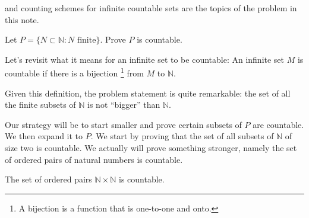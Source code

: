  and counting schemes for infinite countable sets are the topics of the problem in this note. 

\vspace{10 mm}
\begin{problem}
Let $P = \{ N \subset \mathbb{N}: N \text{  finite}\}$. Prove $P$ is countable.	     
\end{problem}

Let's revisit what it means for an infinite set to be countable: An infinite set $M$ is countable if there is a bijection \footnote{A bijection is a function that is one-to-one and onto.} from $M$ to $\mathbb{N}$. 

Given this definition, the problem statement is quite remarkable: the set of all the finite subsets of $\mathbb{N}$ is not ``bigger'' than $\mathbb{N}$.
\newline

\noindent Our strategy will be to start smaller and prove certain subsets of $P$ are countable. We then expand it to $P$. We start by proving that the set of all subsets of $\mathbb{N}$ of size two is countable. We actually will prove something stronger, namely the set of ordered pairs of natural numbers is countable.

\begin{thm}\label{countingpairs}
The set of ordered pairs $\mathbb{N} \times \mathbb{N}$ is countable.
\end{thm}



